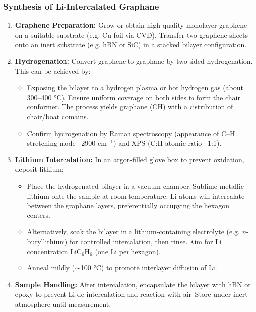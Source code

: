 \documentclass[11pt,a4paper]{article}
\begin{document}
\subsubsection{Synthesis of Li-Intercalated Graphane}
\label{ssubsec:synthesis_detailed}
\begin{enumerate}
\item \textbf{Graphene Preparation:} Grow or obtain high-quality monolayer graphene on a suitable substrate (e.g. Cu foil via CVD). Transfer two graphene sheets onto an inert substrate (e.g. hBN or SiC) in a stacked bilayer configuration.
\item \textbf{Hydrogenation:} Convert graphene to graphane by two-sided hydrogenation. This can be achieved by:
\begin{itemize}
\item Exposing the bilayer to a hydrogen plasma or hot hydrogen gas (about 300–400 °C). Ensure uniform coverage on both sides to form the chair conformer. The process yields graphane (CH) with a distribution of chair/boat domains.
\item Confirm hydrogenation by Raman spectroscopy (appearance of C–H stretching mode ~2900 cm$^{-1}$) and XPS (C:H atomic ratio ~1:1).
\end{itemize}
\item \textbf{Lithium Intercalation:} In an argon-filled glove box to prevent oxidation, deposit lithium:
\begin{itemize}
\item Place the hydrogenated bilayer in a vacuum chamber. Sublime metallic lithium onto the sample at room temperature. Li atoms will intercalate between the graphane layers, preferentially occupying the hexagon centers.
\item Alternatively, soak the bilayer in a lithium-containing electrolyte (e.g. $n$-butyllithium) for controlled intercalation, then rinse. Aim for Li concentration LiC$_6$H$_6$ (one Li per hexagon).
\item Anneal mildly (∼100 °C) to promote interlayer diffusion of Li.
\end{itemize}
\item \textbf{Sample Handling:} After intercalation, encapsulate the bilayer with hBN or epoxy to prevent Li de-intercalation and reaction with air. Store under inert atmosphere until measurement.
\end{enumerate}
\end{document}
